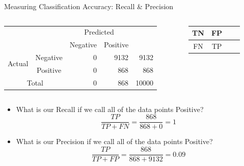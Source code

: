 \documentclass[aspectratio=169]{beamer}
\begin{document}
\begin{frame}{Measuring Classification Accuracy: Recall \& Precision}

\begin{columns}[c]
\begin{column}{0.7\textwidth}

\begin{tabular}{|c|c|r|r|r|} \hline
\multicolumn{2}{|c|}{}   &   \multicolumn{2}{c|}{Predicted}  & \\ \cline{3-4}
\multicolumn{2}{|c|}{} & Negative & Positive  & \\ \hline  
\multirow{2}{*}{Actual} & Negative & 0 & 9132  & 9132 \\ \cline{2-5}
 & Positive & 0 & 868  & 868 \\ \hline \hline
 \multicolumn{2}{|c|}{Total} & 0 & 868  & 10000\\ \hline
 \end{tabular}
\end{column}
\begin{column}{0.3\textwidth}

\begin{tabular}{|c|c|c|c|} \hline
TN & FP\\ \hline
FN & TP \\ \hline
 \end{tabular}
\end{column}
\end{columns}
\begin{itemize}
	\item What is our Recall if we call all of the data points Positive?
	$$\frac{TP}{TP + FN} = \frac{868}{868+0} = 1$$
	\item What is our Precision if we call all of the data points Positive?
	$$\frac{TP}{TP+FP} = \frac{868}{868 + 9132} = 0.09$$
\end{itemize}

	
\end{frame}
\end{document}
